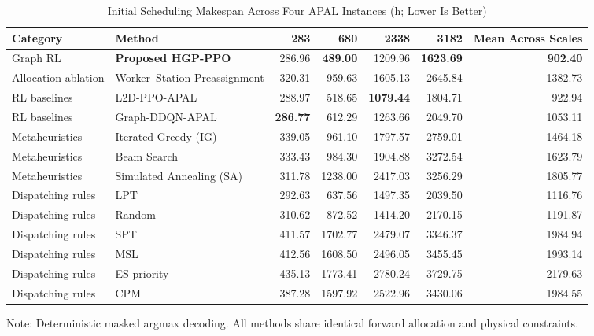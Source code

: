 \documentclass[journal,10pt]{IEEEtran}
\renewcommand{\arraystretch}{0.98}
\begin{document}
\begin{table}[!t]
\centering
\caption{Initial Scheduling Makespan Across Four APAL Instances (h; Lower Is Better)}
\label{tab:initial_results}
\setlength{\tabcolsep}{6pt}
\renewcommand{\arraystretch}{0.98}
\begin{adjustbox}{max width=\textwidth}
\begin{tabular}{@{}llrrrrr@{}}
\toprule
\textbf{Category} & \textbf{Method} & \textbf{283} & \textbf{680} & \textbf{2338} & \textbf{3182} & \textbf{Mean Across Scales} \\
\midrule
Graph RL & \textbf{Proposed HGP-PPO} & 286.96 & \textbf{489.00} & 1209.96 & \textbf{1623.69} & \textbf{902.40} \\
Allocation ablation & Worker--Station Preassignment & 320.31 & 959.63 & 1605.13 & 2645.84 & 1382.73 \\
RL baselines & L2D-PPO-APAL & 288.97 & 518.65 & \textbf{1079.44} & 1804.71 & 922.94 \\
RL baselines & Graph-DDQN-APAL & \textbf{286.77} & 612.29 & 1263.66 & 2049.70 & 1053.11 \\
Metaheuristics & Iterated Greedy (IG) & 339.05 & 961.10 & 1797.57 & 2759.01 & 1464.18 \\
Metaheuristics & Beam Search & 333.43 & 984.30 & 1904.88 & 3272.54 & 1623.79 \\
Metaheuristics & Simulated Annealing (SA) & 311.78 & 1238.00 & 2417.03 & 3256.29 & 1805.77 \\
Dispatching rules & LPT & 292.63 & 637.56 & 1497.35 & 2039.50 & 1116.76 \\
Dispatching rules & Random & 310.62 & 872.52 & 1414.20 & 2170.15 & 1191.87 \\
Dispatching rules & SPT & 411.57 & 1702.77 & 2479.07 & 3346.37 & 1984.94 \\
Dispatching rules & MSL & 412.56 & 1608.50 & 2496.05 & 3455.45 & 1993.14 \\
Dispatching rules & ES-priority & 435.13 & 1773.41 & 2780.24 & 3729.75 & 2179.63 \\
Dispatching rules & CPM & 387.28 & 1597.92 & 2522.96 & 3430.06 & 1984.55 \\
\bottomrule
\end{tabular}
\end{adjustbox}
\par\smallskip
{\footnotesize Note: Deterministic masked argmax decoding. All methods share identical forward allocation and physical constraints.}
\end{table}
\end{document}
